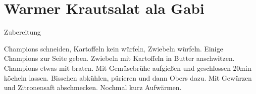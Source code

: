 \chapter*{Warmer Krautsalat ala Gabi}

{\Large Zubereitung} \newline
\begin{addmargin}[1cm]{0cm}
	Champions schneiden, Kartoffeln kein würfeln, Zwiebeln würfeln.
	Einige Champions zur Seite geben.\newline
	Zwiebeln mit Kartoffeln in Butter anschwitzen.
	Champions etwas mit braten.\newline
	Mit Gemüsebrühe aufgießen und geschlossen 20min köcheln lassen.\newline
	Bisschen abkühlen, pürieren und dann Obers dazu.\newline
	Mit Gewürzen und Zitronensaft abschmecken.\newline
	Nochmal kurz Aufwärmen.
	
	
	
\end{addmargin}

